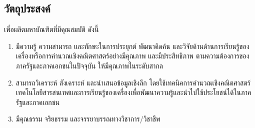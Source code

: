 \subsection{วัตถุประสงค์}
	เพื่อผลิตมหาบัณฑิตที่มีคุณสมบัติ ดังนี้
\begin{enumerate}
	\item มีความรู้ ความสามารถ และทักษะในการประยุกต์ พัฒนาคิดค้น และวิจัยด้านด้านการเรียนรู้ของเครื่องหรือการคำนวณเชิงคณิตศาสตร์อย่างมีคุณภาพ และมีประสิทธิภาพ ตามความต้องการของภาครัฐและภาคเอกชนในปัจจุบัน ให้มีคุณภาพในระดับสากล
	\item สามารถวิเคราะห์ สังเคราะห์ และนำเสนอข้อมูลเชิงลึก โดยใช้เทคนิคการคำนวณเชิงคณิตศาสตร์ เทคโนโลยีสารสนเทศและการเรียนรู้ของเครื่องเพื่อพัฒนาความรู้และนำไปใช้ประโยชน์ได้ในภาครัฐและภาคเอกชน
	\item มีคุณธรรม จริยธรรม และจรรยาบรรณทางวิชาการ/วิชาชีพ 
\end{enumerate}


